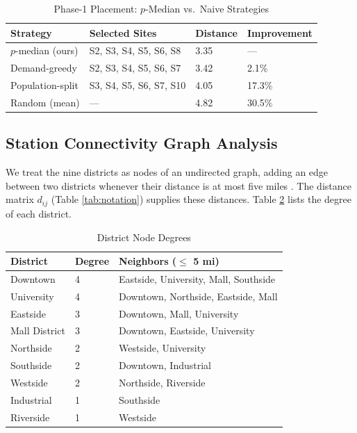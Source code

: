 \documentclass[12pt]{article}
\begin{document}
\begin{table}[H]
\centering
\caption{Phase-1 Placement: $p$-Median vs.\ Naive Strategies}
\label{tab:baseline}
\renewcommand{\arraystretch}{0.95}
\begin{tabular}{@{}p{}p{}p{}p{}@{}}
\toprule
Strategy & Selected Sites & Distance & Improvement \\
\midrule
$p$-median (ours) & S2, S3, S4, S5, S6, S8 & 3.35 & --- \\
Demand-greedy & S2, S3, S4, S5, S6, S7 & 3.42 & 2.1\% \\
Population-split & S3, S4, S5, S6, S7, S10 & 4.05 & 17.3\% \\
Random (mean) & --- & 4.82 & 30.5\% \\
\bottomrule
\end{tabular}
\end{table}

\subsection{Station Connectivity Graph Analysis}

We treat the nine districts as nodes of an undirected graph, adding an edge between two
districts whenever their distance is at most five miles \cite{Newman2010}. The distance
matrix $d_{ij}$ (Table \ref{tab:notation}) supplies these distances.
Table \ref{tab:degrees} lists the degree of each district.

\begin{table}[H]
\centering
\caption{District Node Degrees}
\label{tab:degrees}
\renewcommand{\arraystretch}{0.95}
\begin{tabular}{@{}p{}p{}p{}@{}}
\toprule
District & Degree & Neighbors ($\leq$ 5 mi) \\
\midrule
Downtown & 4 & Eastside, University, Mall, Southside \\
University & 4 & Downtown, Northside, Eastside, Mall \\
Eastside & 3 & Downtown, Mall, University \\
Mall District & 3 & Downtown, Eastside, University \\
Northside & 2 & Westside, University \\
Southside & 2 & Downtown, Industrial \\
Westside & 2 & Northside, Riverside \\
Industrial & 1 & Southside \\
Riverside & 1 & Westside \\
\bottomrule
\end{tabular}
\end{table}
\end{document}
